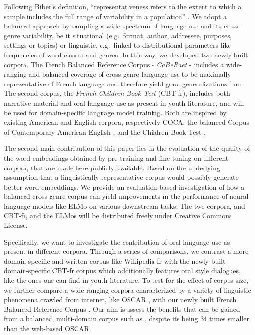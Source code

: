 Following Biber's definition, “representativeness refers to the extent to which a sample includes the full range of variability in a population” \citep{biber-1993-representativeness}. We adopt a balanced approach by sampling a wide spectrum of language use and its cross-genre variability, be it situational (e.g.\ format, author, addressee, purposes, settings or topics) or linguistic, e.g.\ linked to distributional parameters like frequencies of word classes and genres.
In this way, we developed two newly built corpora. The French Balanced Reference Corpus - \textit{CaBeRnet} - includes a wide-ranging and balanced coverage of cross-genre language use to be maximally representative of French language and therefore yield good generalizations from. The second corpus, the \textit{French Children Book Test} (CBT-fr), includes both narrative material and oral language use as present in youth literature, and will be used for domain-specific language model training. Both are inspired by existing American and English corpora, respectively  COCA, the balanced Corpus of Contemporary American English \citep{davies-2009-the, davies-2010-the}, and the Children Book Test \citep[CBT]{hill-etal-2016-the}.

The second main contribution of this paper lies in the evaluation of the quality of the word-embeddings obtained by pre-training and fine-tuning on different corpora, that are made here publicly available.
Based on the underlying assumption that a linguistically representative corpus would possibly generate better word-embeddings. %
We provide an evaluation-based investigation of how a balanced cross-genre corpus can yield improvements in the performance of neural language models like ELMo \citep{peters-etal-2018-deep} on various downstream tasks.
The two corpora, \Cabernet and CBT-fr, and the ELMos will be distributed freely under Creative Commons License.

Specifically, we want to investigate the contribution of oral language use as present in different corpora. Through a series of comparisons, we contrast a more domain-specific and written corpus like Wikipedia-fr with the newly built domain-specific CBT-fr corpus which additionally features oral style dialogues, like the ones one can find in youth literature. To test for the effect of corpus size, we further compare a wide ranging corpora characterized by a variety of linguistic phenomena crawled from internet, like OSCAR \citep{ortiz-suarez-etal-2019-asynchronous}, with our newly built French Balanced Reference Corpus \Cabernet.
Our aim is assess the benefits that can be gained from a balanced, multi-domain corpus such as \Cabernet, despite its being 34 times smaller than the web-based OSCAR.

